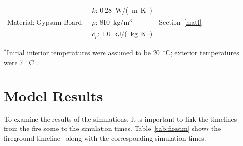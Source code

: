 \begin{table}[h!]
\begin{tabular}{lll}
\multirow{3}{*}{Material: Gypsum Board~\cite{WAKILI2007}}  &  $k$: 0.28~\si{W/(m.K)}                       &  \multirow{3}{*}{Section~\ref{matl}}  \\ 
                                                           &  $\rho$: 810~kg/m$^3$                         &                                       \\ 
                                                           &  $c_{p}$: 1.0~\si{kJ/(kg.K)}                  &                                       \\
\bottomrule[1.25pt]
\end{tabular}\par
\footnotesize
$^{*}$Initial interior temperatures were assumed to be 20~$^{\circ}$C; exterior temperatures were 7~$^{\circ}$C~\cite{NIOSH:Bowyer}.
\normalsize
\end{table}

\section{Model Results}
\label{results}

To examine the results of the simulations, it is important to link the timelines from the fire scene to the simulation times. Table~\ref{tab:firesim} shows the fireground timeline~\cite{NIOSH:Bowyer} along with the corresponding simulation times.

